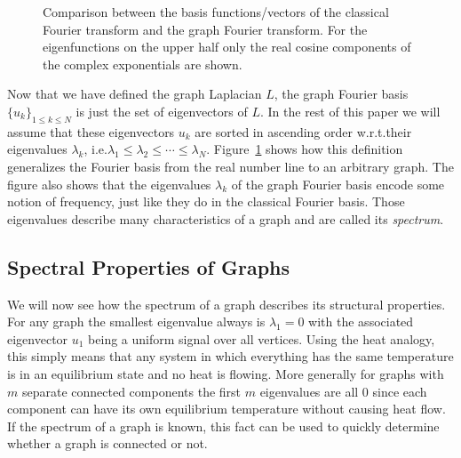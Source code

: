 \begin{figure}
	\centering
	\caption{
		Comparison between the basis functions/vectors of the classical Fourier transform and the graph Fourier transform.
		For the eigenfunctions on the upper half only the real cosine components of the complex exponentials are shown.
	}\label{fig:sgt:graphFourier}
\end{figure}
Now that we have defined the graph Laplacian $L$, the graph Fourier basis ${\{ u_k \}}_{1 \leq k \leq N}$ is just the set of eigenvectors of $L$.
In the rest of this paper we will assume that these eigenvectors $u_k$ are sorted in ascending order w.r.t.\@ their eigenvalues $\lambda_k$, i.e.\@ $\lambda_1 \leq \lambda_2 \leq \cdots \leq \lambda_N$.
Figure~\ref{fig:sgt:graphFourier} shows how this definition generalizes the Fourier basis from the real number line to an arbitrary graph.
The figure also shows that the eigenvalues $\lambda_k$ of the graph Fourier basis encode some notion of frequency, just like they do in the classical Fourier basis.
Those eigenvalues describe many characteristics of a graph and are called its \textit{spectrum}.

\subsection{Spectral Properties of Graphs}%
\label{sec:sgt:spectrum}

We will now see how the spectrum of a graph describes its structural properties.
For any graph the smallest eigenvalue always is $\lambda_1 = 0$ with the associated eigenvector $u_1$ being a uniform signal over all vertices.
Using the heat analogy, this simply means that any system in which everything has the same temperature is in an equilibrium state and no heat is flowing.
More generally for graphs with $m$ separate connected components the first $m$ eigenvalues are all $0$ since each component can have its own equilibrium temperature without causing heat flow.
If the spectrum of a graph is known, this fact can be used to quickly determine whether a graph is connected or not.

